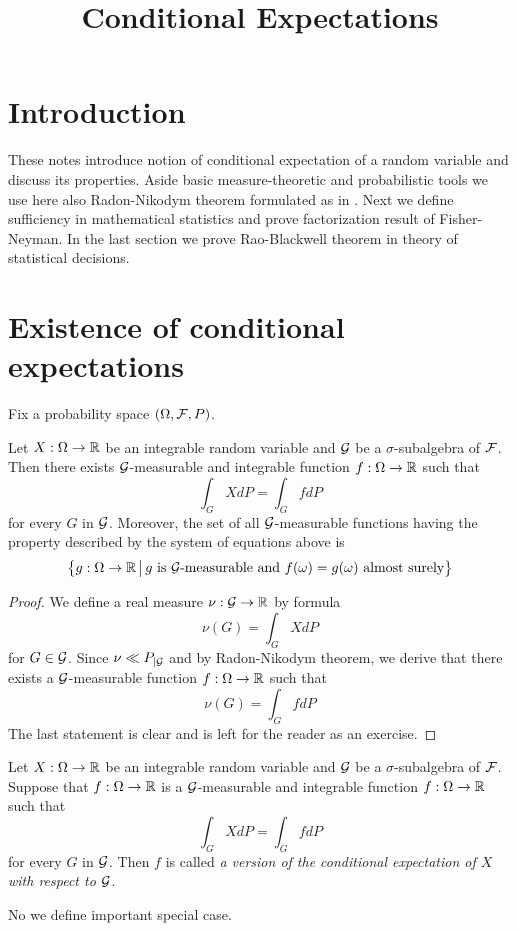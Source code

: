 



\title{Conditional Expectations}
\date{}
\maketitle
\section{Introduction}
These notes introduce notion of conditional expectation of a random variable and discuss its properties. Aside basic measure-theoretic and probabilistic tools we use here also Radon-Nikodym theorem formulated as in {\cite[Theorem 5.3]{RadonNikodymHahnJordanLebesguedecomposition}}. Next we define sufficiency in mathematical statistics and prove factorization result of Fisher-Neyman. In the last section we prove Rao-Blackwell theorem in theory of statistical decisions. 

\section{Existence of conditional expectations}
\noindent
Fix a probability space $(\Omega, {\mathcal F}, P)$.

\begin{theorem}\label{theorem:existenceofconditionalexpectationforintegrable}
Let $X:\Omega \rightarrow {\mathbb R}$ be an integrable random variable and ${\mathcal G}$ be a $\sigma$-subalgebra of ${\mathcal F}$. Then there exists ${\mathcal G}$-measurable and integrable function $f:\Omega \rightarrow {\mathbb R}$ such that
$$\int_GXdP = \int_G f dP$$
for every $G$ in ${\mathcal G}$. Moreover, the set of all ${\mathcal G}$-measurable functions having the property described by the system of equations above is
$$\big\{g:\Omega \rightarrow {\mathbb R}\,\big|\,g\mbox{ is }{\mathcal G}\mbox{-measurable and }f(\omega)=g(\omega)\mbox{ almost surely}\big\}$$
\end{theorem}
\begin{proof}
We define a real measure $\nu:{\mathcal G}\rightarrow {\mathbb R}$ by formula
$$\nu(G) = \int_G XdP$$
for $G\in {\mathcal G}$. Since $\nu \ll P_{\mid {\mathcal G}}$ and by Radon-Nikodym theorem, we derive that there exists a ${\mathcal G}$-measurable function $f:\Omega \rightarrow {\mathbb R}$ such that
$$\nu(G) = \int_G f dP$$
The last statement is clear and is left for the reader as an exercise.
\end{proof}

\begin{definition}
Let $X:\Omega \rightarrow {\mathbb R}$ be an integrable random variable and ${\mathcal G}$ be a $\sigma$-subalgebra of ${\mathcal F}$. Suppose that $f:\Omega \rightarrow {\mathbb R}$ is a ${\mathcal G}$-measurable and integrable function $f:\Omega \rightarrow {\mathbb R}$ such that 
$$\int_GXdP = \int_G f dP$$
for every $G$ in ${\mathcal G}$. Then $f$ is called \textit{a version of the conditional expectation of $X$ with respect to ${\mathcal G}$}.
\end{definition}
\noindent
No we define important special case.

